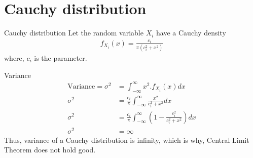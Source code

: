 \documentclass{beamer}
\providecommand{\brak}[1]{\ensuremath{\left(#1\right)}}
\providecommand{\brak}[1]{\ensuremath{\left(#1\right)}}
\begin{document}
\section{Cauchy distribution}
\begin{frame}{Cauchy distribution}
    Let the random variable $X_i$ have a Cauchy density
    \begin{align}
        f_{X_i}(x) = \frac{c_i}{\pi (c_i^2 + x^2)}
    \end{align}
    where, $c_i$ is the parameter.
\end{frame}
\begin{frame}{Variance}
\begin{align}
    \text{Variance} = \sigma^2 &= \int_{-\infty}^\infty x^2.f_{X_i}(x) dx\\
    \sigma^2 &= \frac{c_i}{\pi} \int_{-\infty}^\infty \frac{x^2}{c_i^2 + x^2}dx\\
    \sigma^2 &= \frac{c_i}{\pi} \int_{-\infty}^\infty \brak{1 - \frac{c_i^2}{c_i^2 + x^2}}dx\\
    \sigma^2 &= \infty
\end{align}
Thus, variance of a Cauchy distribution is infinity, which is why, Central Limit Theorem does not hold good.
\end{frame}
\end{document}
